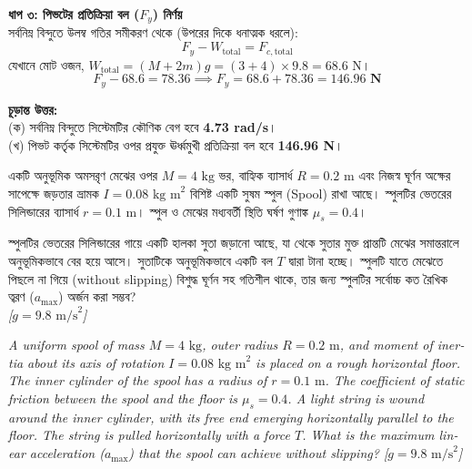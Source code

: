 \documentclass[12pt, a4paper]{article}
\begin{document}
\begin{tcolorbox}[solutionbox={সমাধান (Solution)}]
\vspace{0.5em}
\noindent
\textbf{ধাপ ৩: পিভটের প্রতিক্রিয়া বল ($F_y$) নির্ণয়} \\
সর্বনিম্ন বিন্দুতে উলম্ব গতির সমীকরণ থেকে (উপরের দিকে ধনাত্মক ধরলে):
\[ F_y - W_{\text{total}} = F_{c,\text{total}} \]
যেখানে মোট ওজন, $W_{\text{total}} = (M + 2m)g = (3 + 4) \times 9.8 = 68.6\text{ N}$।
\[ F_y - 68.6 = 78.36 \implies F_y = 68.6 + 78.36 = \mathbf{146.96\text{ N}} \]

\vspace{1em}
\begin{tcolorbox}[answerbox]
\textbf{চূড়ান্ত উত্তর:} \\
(ক) সর্বনিম্ন বিন্দুতে সিস্টেমটির কৌণিক বেগ হবে \textbf{4.73 rad/s}। \\
(খ) পিভট কর্তৃক সিস্টেমটির ওপর প্রযুক্ত ঊর্ধ্বমুখী প্রতিক্রিয়া বল হবে \textbf{146.96 N}।
\end{tcolorbox}
\end{tcolorbox}


\begin{tcolorbox}[questionbox={প্রশ্ন (Question) 6}]
\noindent
একটি অনুভূমিক অমসরৃণ মেঝের ওপর $M = 4\text{ kg}$ ভর, বাহ্যিক ব্যাসার্ধ $R = 0.2\text{ m}$ এবং নিজস্ব ঘূর্ণন অক্ষের সাপেক্ষে জড়তার ভ্রামক $I = 0.08\text{ kg m}^2$ বিশিষ্ট একটি সুষম স্পুল (Spool) রাখা আছে। স্পুলটির ভেতরের সিলিন্ডারের ব্যাসার্ধ $r = 0.1\text{ m}$। স্পুল ও মেঝের মধ্যবর্তী স্থিতি ঘর্ষণ গুণাঙ্ক $\mu_s = 0.4$। 

\vspace{0.3em}
\noindent
স্পুলটির ভেতরের সিলিন্ডারের গায়ে একটি হালকা সুতা জড়ানো আছে, যা থেকে সুতার মুক্ত প্রান্তটি মেঝের সমান্তরালে অনুভূমিকভাবে বের হয়ে আসে। সুতাটিকে অনুভূমিকভাবে একটি বল $T$ দ্বারা টানা হচ্ছে। স্পুলটি যাতে মেঝেতে পিছলে না গিয়ে (without slipping) বিশুদ্ধ ঘূর্ণন সহ গতিশীল থাকে, তার জন্য স্পুলটির সর্বোচ্চ কত রৈখিক ত্বরণ ($a_{\text{max}}$) অর্জন করা সম্ভব? \\
\textit{[$g = 9.8\text{ m/s}^2$]}

\vspace{0.8em}
\begin{english}
\noindent\textit{\color{darkgray}
A uniform spool of mass $M = 4\text{ kg}$, outer radius $R = 0.2\text{ m}$, and moment of inertia about its axis of rotation $I = 0.08\text{ kg m}^2$ is placed on a rough horizontal floor. The inner cylinder of the spool has a radius of $r = 0.1\text{ m}$. The coefficient of static friction between the spool and the floor is $\mu_s = 0.4$. A light string is wound around the inner cylinder, with its free end emerging horizontally parallel to the floor. The string is pulled horizontally with a force $T$. What is the maximum linear acceleration ($a_{\text{max}}$) that the spool can achieve without slipping? [$g = 9.8\text{ m/s}^2$]
}
\end{english}
\end{tcolorbox}
\end{document}
